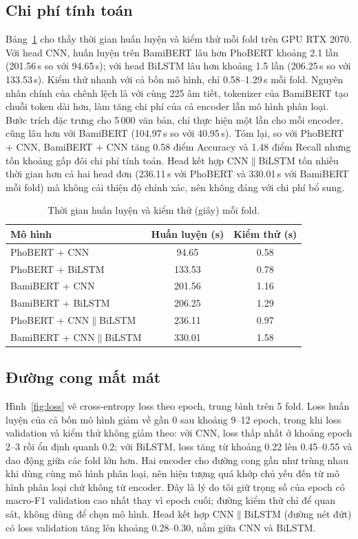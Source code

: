 \documentclass[conference,a4paper]{IEEEtran}
\begin{document}
\subsection{Chi phí tính toán}
Bảng~\ref{tab:time} cho thấy thời gian huấn luyện và kiểm thử mỗi fold trên GPU RTX 2070. Với head CNN, huấn luyện trên BamiBERT lâu hơn PhoBERT khoảng 2.1 lần (201.56\,s so với 94.65\,s); với head BiLSTM lâu hơn khoảng 1.5 lần (206.25\,s so với 133.53\,s). Kiểm thử nhanh với cả bốn mô hình, chỉ 0.58--1.29\,s mỗi fold. Nguyên nhân chính của chênh lệch là với cùng 225 âm tiết, tokenizer của BamiBERT tạo chuỗi token dài hơn, làm tăng chi phí của cả encoder lẫn mô hình phân loại. Bước trích đặc trưng cho 5\,000 văn bản, chỉ thực hiện một lần cho mỗi encoder, cũng lâu hơn với BamiBERT (104.97\,s so với 40.95\,s). Tóm lại, so với PhoBERT + CNN, BamiBERT + CNN tăng 0.58 điểm Accuracy và 1.48 điểm Recall nhưng tốn khoảng gấp đôi chi phí tính toán. Head kết hợp CNN$\|$BiLSTM tốn nhiều thời gian hơn cả hai head đơn (236.11\,s với PhoBERT và 330.01\,s với BamiBERT mỗi fold) mà không cải thiện độ chính xác, nên không đáng với chi phí bổ sung.

\begin{table}[t]
  \centering
  \caption{Thời gian huấn luyện và kiểm thử (giây) mỗi fold.}
  \label{tab:time}
  \setlength{\tabcolsep}{6pt}
  \begin{tabular}{lcc}
    \toprule
    Mô hình & Huấn luyện (s) & Kiểm thử (s) \\
    \midrule
    PhoBERT + CNN     &  94.65 & 0.58 \\
    PhoBERT + BiLSTM  & 133.53 & 0.78 \\
    BamiBERT + CNN    & 201.56 & 1.16 \\
    BamiBERT + BiLSTM & 206.25 & 1.29 \\
    \midrule
    {\scriptsize PhoBERT + CNN$\|$BiLSTM} & 236.11 & 0.97 \\
    {\scriptsize BamiBERT + CNN$\|$BiLSTM} & 330.01 & 1.58 \\
    \bottomrule
  \end{tabular}
\end{table}

\subsection{Đường cong mất mát}
Hình~\ref{fig:loss} vẽ cross-entropy loss theo epoch, trung bình trên 5 fold. Loss huấn luyện của cả bốn mô hình giảm về gần 0 sau khoảng 9--12 epoch, trong khi loss validation và kiểm thử không giảm theo: với CNN, loss thấp nhất ở khoảng epoch 2--3 rồi ổn định quanh 0.2; với BiLSTM, loss tăng từ khoảng 0.22 lên 0.45--0.55 và dao động giữa các fold lớn hơn. Hai encoder cho đường cong gần như trùng nhau khi dùng cùng mô hình phân loại, nên hiện tượng quá khớp chủ yếu đến từ mô hình phân loại chứ không từ encoder. Đây là lý do tôi giữ trọng số của epoch có macro-F1 validation cao nhất thay vì epoch cuối; đường kiểm thử chỉ để quan sát, không dùng để chọn mô hình. Head kết hợp CNN$\|$BiLSTM (đường nét đứt) có loss validation tăng lên khoảng 0.28--0.30, nằm giữa CNN và BiLSTM.
\end{document}
